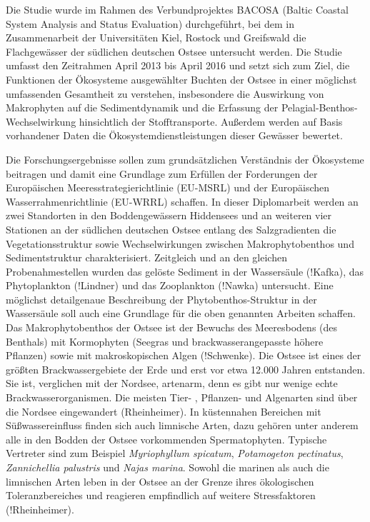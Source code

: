 Die Studie wurde im Rahmen des Verbundprojektes BACOSA (Baltic Coastal System Analysis and Status Evaluation) durchgeführt, bei dem in Zusammenarbeit der Universitäten Kiel, Rostock und Greifswald die Flachgewässer der südlichen deutschen Ostsee untersucht werden. Die Studie umfasst den Zeitrahmen April 2013 bis April 2016 und setzt sich zum Ziel, die Funktionen der Ökosysteme ausgewählter Buchten der Ostsee in einer möglichst umfassenden Gesamtheit zu verstehen, insbesondere die Auswirkung von Makrophyten auf die Sedimentdynamik und die Erfassung der Pelagial-Benthos-Wechselwirkung hinsichtlich der Stofftransporte. Außerdem werden auf Basis vorhandener Daten die Ökosystemdienstleistungen dieser Gewässer bewertet. 

Die Forschungsergebnisse sollen zum grundsätzlichen Verständnis der Ökosysteme beitragen und damit eine Grundlage zum Erfüllen der Forderungen der Europäischen Meeresstrategierichtlinie (EU-MSRL) und der Europäischen Wasserrahmenrichtlinie (EU-WRRL) schaffen. In dieser Diplomarbeit werden an zwei Standorten in den Boddengewässern Hiddensees und an weiteren vier Stationen an der südlichen deutschen Ostsee entlang des Salzgradienten die Vegetationsstruktur sowie Wechselwirkungen zwischen Makrophytobenthos und Sedimentstruktur charakterisiert. Zeitgleich und an den gleichen Probenahmestellen wurden das gelöste Sediment in der Wassersäule (!Kafka), das Phytoplankton (!Lindner) und das Zooplankton (!Nawka) untersucht. Eine möglichst detailgenaue Beschreibung der Phytobenthos-Struktur in der Wassersäule soll auch eine Grundlage für die oben genannten Arbeiten schaffen.
\\
Das Makrophytobenthos der Ostsee ist der Bewuchs des Meeresbodens (des Benthals) mit Kormophyten (Seegras und brackwasserangepasste höhere Pflanzen) sowie mit makroskopischen Algen (!Schwenke). Die Ostsee ist eines der größten Brackwassergebiete der Erde und erst vor etwa 12.000 Jahren entstanden. Sie ist, verglichen mit der Nordsee, artenarm, denn es gibt nur wenige echte Brackwasserorganismen. Die meisten Tier- , Pflanzen- und Algenarten sind über die Nordsee eingewandert (Rheinheimer). In küstennahen Bereichen mit Süßwassereinfluss finden sich auch limnische Arten, dazu gehören unter anderem alle in den Bodden der Ostsee vorkommenden Spermatophyten. Typische Vertreter sind zum Beispiel \textit{Myriophyllum spicatum}, \textit{Potamogeton pectinatus}, \textit{Zannichellia palustris} und \textit{Najas marina}. Sowohl die marinen als auch die limnischen Arten leben in der Ostsee an der Grenze ihres ökologischen Toleranzbereiches und reagieren empfindlich auf weitere Stressfaktoren (!Rheinheimer).

